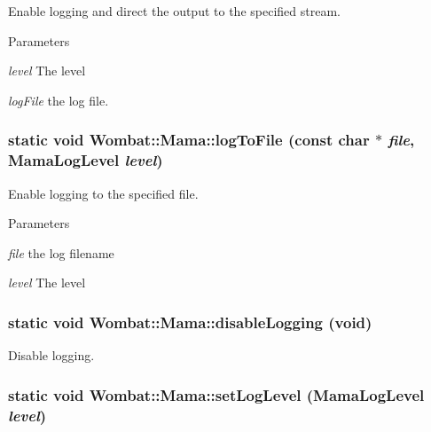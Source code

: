 Enable logging and direct the output to the specified stream. 
\begin{DoxyParams}{Parameters}
\item[{\em level}]The level \item[{\em logFile}]the log file. \end{DoxyParams}
\hypertarget{classWombat_1_1Mama_a53e48c0d9a4bc014cfbdcc189609399c}{
\subsubsection[{logToFile}]{\setlength{\rightskip}{0pt plus 5cm}static void Wombat::Mama::logToFile (const char $\ast$ {\em file}, \/  MamaLogLevel {\em level})}}
\label{classWombat_1_1Mama_a53e48c0d9a4bc014cfbdcc189609399c}


Enable logging to the specified file. 
\begin{DoxyParams}{Parameters}
\item[{\em file}]the log filename \item[{\em level}]The level \end{DoxyParams}
\hypertarget{classWombat_1_1Mama_a519f2d70a7a3784068db8419ffec64c0}{
\subsubsection[{disableLogging}]{\setlength{\rightskip}{0pt plus 5cm}static void Wombat::Mama::disableLogging (void)}}
\label{classWombat_1_1Mama_a519f2d70a7a3784068db8419ffec64c0}


Disable logging. \hypertarget{classWombat_1_1Mama_afaa40b807211f0d42a7badabe8d0c632}{
\subsubsection[{setLogLevel}]{\setlength{\rightskip}{0pt plus 5cm}static void Wombat::Mama::setLogLevel (MamaLogLevel {\em level})}}
\label{classWombat_1_1Mama_afaa40b807211f0d42a7badabe8d0c632}


